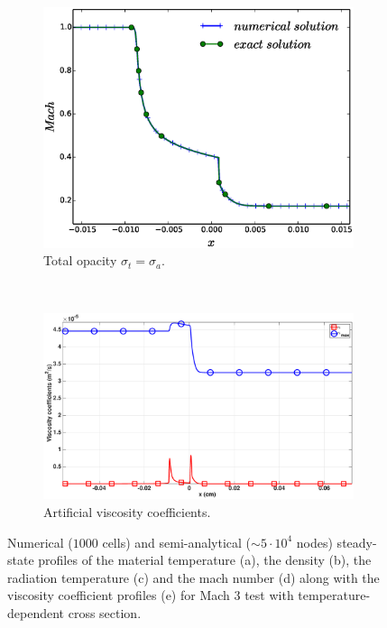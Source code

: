 \documentclass[times,doublespace]{fldauth}%
\begin{document}
\begin{figure}[h]
    \begin{center}
    \begin{subfigure}{0.32\textwidth}
    \centering
    \includegraphics[width=\linewidth]{figures/dpt-xs/mach-3-mach-number-nel-1000-plot.eps}
    \caption{Total opacity $\sigma_t = \sigma_a$.}\label{fig:mach-3-dpt-xs-xs}
    \end{subfigure}
    ~
    \begin{subfigure}{0.32\textwidth}
    \centering
    \includegraphics[width=\linewidth]{figures/dpt-xs/mach_3_nel_1000_viscosity.eps}
    \caption{Artificial viscosity coefficients.}\label{fig:mach-3-dpt-xs-visc}
    \end{subfigure}      
    \end{center}  
\caption{Numerical ($1000$ cells) and semi-analytical ($\sim 5 \cdot 10^4$ nodes) steady-state profiles of the material temperature (a), the density (b), the radiation temperature (c) and the mach number (d) along with the viscosity coefficient profiles (e) for Mach $3$ test with temperature-dependent cross section.}\label{fig:mach-3-temp-dep-xs}    
\end{figure}
\end{document}
